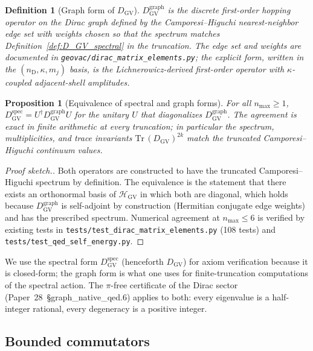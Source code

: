 \documentclass[11pt]{article}
\newtheorem{proposition}{Proposition}
\newtheorem{definition}{Definition}
\begin{document}
\begin{definition}[Graph form of $D_{\mathrm{GV}}$]
\label{def:D_GV_graph}
$D_{\mathrm{GV}}^{\mathrm{graph}}$ is the discrete first-order
hopping operator on the Dirac graph defined by the Camporesi--Higuchi
nearest-neighbor edge set with weights chosen so that the spectrum
matches Definition~\ref{def:D_GV_spectral} in the truncation.  The
edge set and weights are documented in
\texttt{geovac/dirac\_matrix\_elements.py}; the explicit form, written
in the $(n_{\mathrm{D}}, \kappa, m_j)$ basis, is the
Lichnerowicz-derived first-order operator with $\kappa$-coupled
adjacent-shell amplitudes.
\end{definition}

\begin{proposition}[Equivalence of spectral and graph forms]
\label{prop:D_equiv}
For all $n_{\max} \ge 1$, $D_{\mathrm{GV}}^{\mathrm{spec}}
= U^{\dagger} D_{\mathrm{GV}}^{\mathrm{graph}} U$ for the unitary
$U$ that diagonalizes $D_{\mathrm{GV}}^{\mathrm{graph}}$.  The
agreement is exact in finite arithmetic at every truncation; in
particular the spectrum, multiplicities, and trace invariants
$\mathrm{Tr}\,(D_{\mathrm{GV}})^{2k}$ match the truncated
Camporesi--Higuchi continuum values.
\end{proposition}

\begin{proof}[Proof sketch.]
Both operators are constructed to have the truncated
Camporesi--Higuchi spectrum by definition.  The equivalence is the
statement that there exists an orthonormal basis of
$\mathcal{H}_{\mathrm{GV}}$ in which both are diagonal, which holds
because $D_{\mathrm{GV}}^{\mathrm{graph}}$ is self-adjoint by
construction (Hermitian conjugate edge weights) and has the prescribed
spectrum.  Numerical agreement at $n_{\max} \le 6$ is verified by
existing tests in \texttt{tests/test\_dirac\_matrix\_elements.py} (108
tests) and \texttt{tests/test\_qed\_self\_energy.py}.
\end{proof}

We use the spectral form $D_{\mathrm{GV}}^{\mathrm{spec}}$ (henceforth
$D_{\mathrm{GV}}$) for axiom verification because it is closed-form;
the graph form is what one uses for finite-truncation computations of
the spectral action.  The $\pi$-free certificate of the Dirac sector
(Paper~28~\S graph\_native\_qed.6) applies to both: every eigenvalue
is a half-integer rational, every degeneracy is a positive integer.

\subsection{Bounded commutators}
\end{document}
